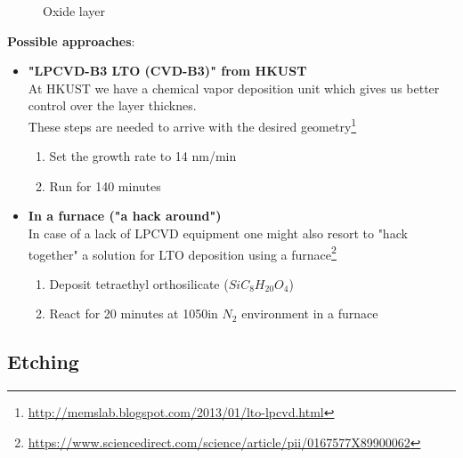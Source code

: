 \begin{figure}[H]
	\centering
	\begin{tikzpicture}[node distance = 3cm, auto, thick,scale=\CrossSectionOnly, every node/.style={transform shape}]
		
	\end{tikzpicture}
	\begin{tikzpicture}[node distance = 3cm, auto, thick,scale=\CrossSectionOnly, every node/.style={transform shape}]
		
	\end{tikzpicture}
	\caption{Oxide layer}
\end{figure}

\textbf{Possible approaches}:
\begin{itemize}
	\item \textbf{"LPCVD-B3 LTO (CVD-B3)" from HKUST} \\
	At HKUST we have a chemical vapor deposition unit which gives us better control over the layer thicknes. \\
	These steps are needed to arrive with the desired geometry\footnote{\url{http://memslab.blogspot.com/2013/01/lto-lpcvd.html}}
	\begin{enumerate}
		\item Set the growth rate to 14 nm/min
		\item Run for 140 minutes
	\end{enumerate}
	\item \textbf{In a furnace ("a hack around")} \\
	In case of a lack of LPCVD equipment one might also resort to "hack together" a solution for LTO deposition using a furnace\footnote{\url{https://www.sciencedirect.com/science/article/pii/0167577X89900062}}
		\begin{enumerate}
			\item Deposit tetraethyl orthosilicate ($Si C_8 H_{20} O_4$)
			\item React for 20 minutes at 1050\degreesC in $N_2$ environment in a furnace
	\end{enumerate}
\end{itemize}

\newpage

\subsection{Etching}\label{via_etching}

